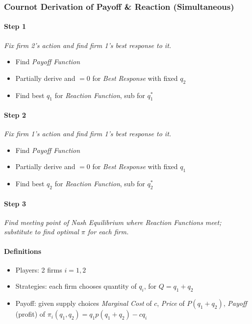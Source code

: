 \documentclass[11pt, english]{article}
\begin{document}
		\subsubsection{Cournot Derivation of Payoff \& Reaction (Simultaneous)}
	
		\paragraph{Step 1}

	\textit{Fix firm 2's action and find firm 1's best response to it.}

	\begin{itemize}
	\setlength\itemsep{0cm}
		\item Find \textit{Payoff Function}
		\item Partially derive and $=0$ for \textit{Best Response} with fixed $q_2$
		\item Find best $q_1$ for \textit{Reaction Function}, sub for $q_1^*$
	\end{itemize}
		
		\paragraph{Step 2}

	\textit{Fix firm 1's action and find firm 1's best response to it.}

	\begin{itemize}
        \setlength\itemsep{0cm}
                \item Find \textit{Payoff Function}
		\item Partially derive and $=0$ for \textit{Best Response} with fixed $q_1$
		\item Find best $q_2$ for \textit{Reaction Function}, sub for $q_2^*$
	\end{itemize}

		\paragraph{Step 3}

	\textit{Find meeting point of Nash Equilibrium where Reaction Functions meet; substitute to find optimal $\pi$ for each firm.}

		\paragraph{Definitions}

	\begin{itemize}                                                    
        \setlength\itemsep{0cm}                                            
                \item Players: 2 firms $i=1,2$
		\item Strategies: each firm chooses quantity of $q_i$, for $Q=q_1+q_2$
		\item Payoff: given supply choices \textit{Marginal Cost} of $c$, \textit{Price} of $P(q_1+q_2)$, \textit{Payoff} (profit) of $\pi_i(q_1,q_2)=q_1p(q_1+q_2)-cq_i$
	\end{itemize}
\end{document}
